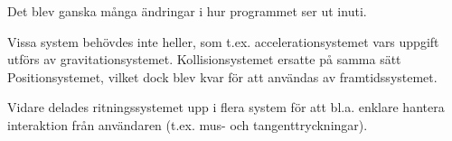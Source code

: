 Det blev ganska många ändringar i hur programmet ser ut inuti.

Vissa system behövdes inte heller, som t.ex. accelerationsystemet
vars uppgift utförs av gravitationsystemet.
Kollisionsystemet ersatte på samma sätt Positionsystemet,
vilket dock blev kvar för att användas av framtidssystemet.

Vidare delades ritningssystemet upp i flera system
för att bl.a. enklare hantera interaktion från användaren (t.ex. mus- och tangenttryckningar).


